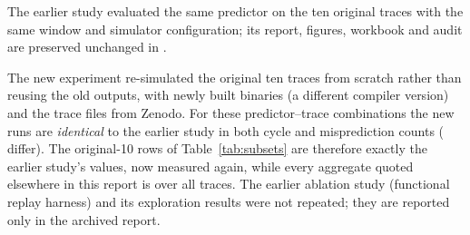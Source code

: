 The earlier study evaluated the same predictor on the ten original traces with the same window and simulator configuration; its report, figures, workbook and audit are preserved unchanged in .

The new experiment re-simulated the original ten traces from scratch rather than reusing the old outputs, with newly built binaries (a different compiler version) and the trace files from Zenodo. For these  predictor--trace combinations the new runs are \emph{identical} to the earlier study in both cycle and misprediction counts ( differ). The original-10 rows of Table~\ref{tab:subsets} are therefore exactly the earlier study's values, now measured again, while every aggregate quoted elsewhere in this report is over all  traces. The earlier ablation study (functional replay harness) and its exploration results were not repeated; they are reported only in the archived report.
